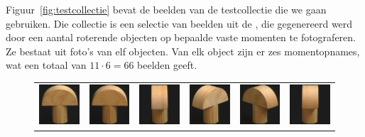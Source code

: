 Figuur~\ref{fig:testcollectie} bevat de beelden van de testcollectie die we gaan 
gebruiken. Die collectie is een selectie van beelden uit
de  \cite{coil-100}, die gegenereerd werd 
door een aantal roterende objecten op bepaalde vaste momenten te fotograferen. 
Ze bestaat uit foto's van elf objecten. Van elk object zijn
er zes momentopnames, wat een totaal van $11 \cdot 6 = 66$ beelden geeft.

\begin{figure}[p]
\vspace{5pt}
\centering

\begin{tabular}{cccccc}

\includegraphics[width=2cm]{coil/beeld-0.eps} &
\includegraphics[width=2cm]{coil/beeld-1.eps} &
\includegraphics[width=2cm]{coil/beeld-2.eps} &
\includegraphics[width=2cm]{coil/beeld-3.eps} &
\includegraphics[width=2cm]{coil/beeld-4.eps} &
\includegraphics[width=2cm]{coil/beeld-5.eps} \\


\end{tabular}
\end{figure}
